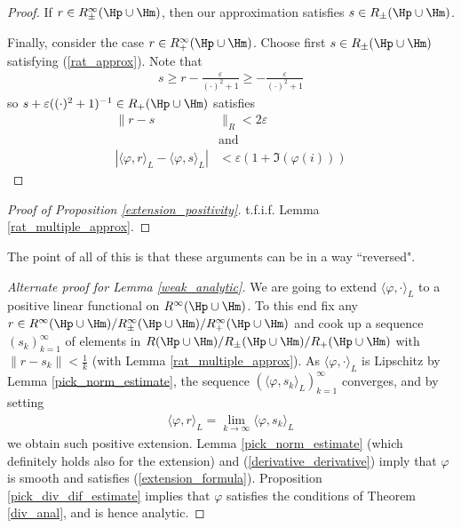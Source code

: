 \begin{proof}
	If $r \in R^{\infty}_{\pm}(\Hp \cup \Hm)$, then our approximation satisfies $s \in R_{\pm}(\Hp \cup \Hm)$.

	Finally, consider the case $r \in R^{\infty}_{+}(\Hp \cup \Hm)$. Choose first $s \in R_{\pm}(\Hp \cup \Hm)$ satisfying (\ref{rat_approx}). Note that
	\begin{align*}
		s \geq r - \frac{\varepsilon}{(\cdot)^2 + 1} \geq -\frac{\varepsilon}{(\cdot)^2 + 1}
	\end{align*}
	so $s + \varepsilon ((\cdot)^2 + 1)^{-1} \in R_{+}(\Hp \cup \Hm)$ satisfies
	\begin{align*}
		\|r - s&\|_{R} < 2\varepsilon \nonumber\\
		&\text{and } \\
		|\langle \varphi, r\rangle_{L} -  \langle \varphi, s\rangle_{L}|& < \varepsilon (1 + \Im(\varphi(i)))
	\end{align*}
\end{proof}

\begin{proof}[Proof of Proposition \ref{extension_positivity}]
	t.f.i.f. Lemma \ref{rat_multiple_approx}.
\end{proof}

The point of all of this is that these arguments can be in a way ``reversed".

\begin{proof}[Alternate proof for Lemma \ref{weak_analytic}]
	We are going to extend $\langle \varphi, \cdot\rangle_{L}$ to a positive linear functional on $R^{\infty}(\Hp \cup \Hm)$. To this end fix any $r \in R^{\infty}(\Hp \cup \Hm)/R^{\infty}_{\pm}(\Hp \cup \Hm)/R^{\infty}_{+}(\Hp \cup \Hm)$ and cook up a sequence $(s_{k})_{k = 1}^{\infty}$ of elements in $R(\Hp \cup \Hm)/R_{\pm}(\Hp \cup \Hm)/R_{+}(\Hp \cup \Hm)$ with $\|r - s_{k}\| < \frac{1}{k}$ (with Lemma \ref{rat_multiple_approx}). As $\langle \varphi, \cdot\rangle_{L}$ is Lipschitz by Lemma \ref{pick_norm_estimate}, the sequence $(\langle \varphi, s_{k} \rangle_{L})_{k = 1}^{\infty}$ converges, and by setting
	\begin{align*}
		\langle \varphi, r\rangle_{L} = \lim_{k \to \infty} \langle \varphi, s_{k}\rangle_{L}
	\end{align*}
	we obtain such positive extension. Lemma \ref{pick_norm_estimate} (which definitely holds also for the extension) and (\ref{derivative_derivative}) imply that $\varphi$ is smooth and satisfies (\ref{extension_formula}). Proposition \ref{pick_div_dif_estimate} implies that $\varphi$ satisfies the conditions of Theorem \ref{div_anal}, and is hence analytic.
\end{proof}

